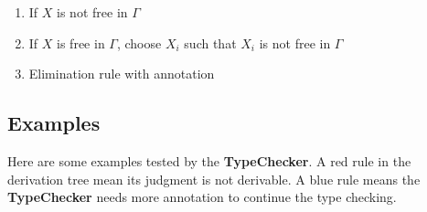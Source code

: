 \documentclass[12pt,a4paper]{article}
\begin{document}
\begin{enumerate}

\item If $X$ is not free in $\Gamma$

\begin{prooftree}
\end{prooftree}

\item If $X$ is free in $\Gamma$, choose $X_i$ such that $X_i$ is not free in $\Gamma$

\begin{prooftree}
\end{prooftree}

\item Elimination rule with annotation

\begin{prooftree}
\end{prooftree}

\end{enumerate}

\subsection{Examples}

Here are some examples tested by the \textbf{TypeChecker}. A red rule in the derivation tree mean its judgment is not derivable. A blue rule means the \textbf{TypeChecker} needs more annotation to continue the type checking. 
\end{document}
